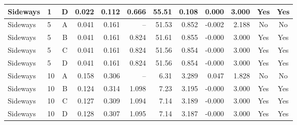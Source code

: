 \documentclass[conference,a4paper]{IEEEtran}
\begin{document}
\begin{table}[!t]
\begin{tabular}{@{}llcrrrrrrrcc@{}}
Sideways & 1 & D & 0.022 & 0.112 & 0.666 & 55.51 & 0.108 & 0.000 & 3.000 & Yes & Yes\\
\midrule
Sideways & 5 & A & 0.041 & 0.161 & -- & 51.53 & 0.852 & -0.002 & 2.188 & No & No\\
Sideways & 5 & B & 0.041 & 0.161 & 0.824 & 51.61 & 0.855 & -0.000 & 3.000 & Yes & Yes\\
Sideways & 5 & C & 0.041 & 0.161 & 0.824 & 51.56 & 0.854 & -0.000 & 3.000 & Yes & Yes\\
Sideways & 5 & D & 0.041 & 0.161 & 0.824 & 51.56 & 0.854 & -0.000 & 3.000 & Yes & Yes\\
\midrule
Sideways & 10 & A & 0.158 & 0.306 & -- & 6.31 & 3.289 & 0.047 & 1.828 & No & No\\
Sideways & 10 & B & 0.124 & 0.314 & 1.098 & 7.23 & 3.195 & -0.000 & 3.000 & Yes & Yes\\
Sideways & 10 & C & 0.127 & 0.309 & 1.094 & 7.14 & 3.189 & -0.000 & 3.000 & Yes & Yes\\
Sideways & 10 & D & 0.128 & 0.307 & 1.095 & 7.14 & 3.187 & -0.000 & 3.000 & Yes & Yes\\
\bottomrule\end{tabular}\end{table}
\end{document}
